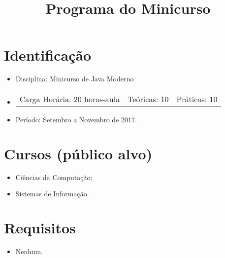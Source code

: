 \documentclass{article}
\title{Programa do Minicurso}
\author{}
\date{}
\begin{document}
\maketitle

\section{Identificação}

\begin{itemize}
    \item[] Disciplina: Minicurso de Java Moderno
    \item[]
        \hspace{-1em}
        \begin{tabular}{ccc}
            Carga Horária: 20 horas-aula&
            Teóricas: 10&
            Práticas: 10
        \end{tabular}
    \item[] Período: Setembro a Novembro de 2017.
\end{itemize}

\section{Cursos (público alvo)}
\begin{itemize}
    \item[] Ciências da Computação;
    \item[] Sistemas de Informação.
\end{itemize}

\section{Requisitos}
\begin{itemize}
    \item[] Nenhum.
\end{itemize}
\end{document}

